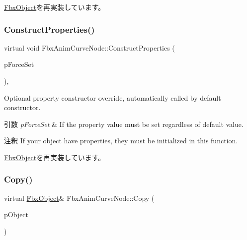 \hyperlink{class_fbx_object_a313503bc645af3fdceb4a99ef5cea7eb}{Fbx\+Object}を再実装しています。

\mbox{\label{class_fbx_anim_curve_node_a979eca26d04013f0ef958173d34aef15}} 
\subsubsection{\texorpdfstring{Construct\+Properties()}{ConstructProperties()}}
{\footnotesize\ttfamily virtual void Fbx\+Anim\+Curve\+Node\+::\+Construct\+Properties (\begin{DoxyParamCaption}\item[{bool}]{p\+Force\+Set }\end{DoxyParamCaption})\hspace{0.3cm}{\ttfamily [protected]}, {\ttfamily [virtual]}}

Optional property constructor override, automatically called by default constructor. 
\begin{DoxyParams}{引数}
{\em p\+Force\+Set} & If the property value must be set regardless of default value. \\
\hline
\end{DoxyParams}
\begin{DoxyRemark}{注釈}
If your object have properties, they must be initialized in this function. 
\end{DoxyRemark}


\hyperlink{class_fbx_object_ad44f814323dc1b5e78bff1bfc608b4bb}{Fbx\+Object}を再実装しています。

\mbox{\label{class_fbx_anim_curve_node_a9630a96fb6927737ff49d6dab352c36f}} 
\subsubsection{\texorpdfstring{Copy()}{Copy()}}
{\footnotesize\ttfamily virtual \hyperlink{class_fbx_object}{Fbx\+Object}\& Fbx\+Anim\+Curve\+Node\+::\+Copy (\begin{DoxyParamCaption}\item[{const \hyperlink{class_fbx_object}{Fbx\+Object} \&}]{p\+Object }\end{DoxyParamCaption})\hspace{0.3cm}{\ttfamily [virtual]}}

